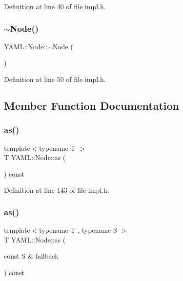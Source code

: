 Definition at line 40 of file impl.\+h.

\mbox{\label{class_y_a_m_l_1_1_node_a29d21a7eceac20e93028810d2c313a06}} 
\subsubsection{\texorpdfstring{$\sim$Node()}{~Node()}}
{\footnotesize\ttfamily Y\+A\+M\+L\+::\+Node\+::$\sim$\+Node (\begin{DoxyParamCaption}{ }\end{DoxyParamCaption})\hspace{0.3cm}{\ttfamily [inline]}}



Definition at line 50 of file impl.\+h.



\subsection{Member Function Documentation}
\mbox{\label{class_y_a_m_l_1_1_node_aa851b856bd5972b42b0b1976adc90606}} 
\subsubsection{\texorpdfstring{as()}{as()}\hspace{0.1cm}{\footnotesize\ttfamily [1/2]}}
{\footnotesize\ttfamily template$<$typename T $>$ \\
T Y\+A\+M\+L\+::\+Node\+::as (\begin{DoxyParamCaption}{ }\end{DoxyParamCaption}) const\hspace{0.3cm}{\ttfamily [inline]}}



Definition at line 143 of file impl.\+h.

\mbox{\label{class_y_a_m_l_1_1_node_a5ea7214df4819515ef54665727fcb751}} 
\subsubsection{\texorpdfstring{as()}{as()}\hspace{0.1cm}{\footnotesize\ttfamily [2/2]}}
{\footnotesize\ttfamily template$<$typename T , typename S $>$ \\
T Y\+A\+M\+L\+::\+Node\+::as (\begin{DoxyParamCaption}\item[{const S \&}]{fallback }\end{DoxyParamCaption}) const\hspace{0.3cm}{\ttfamily [inline]}}



